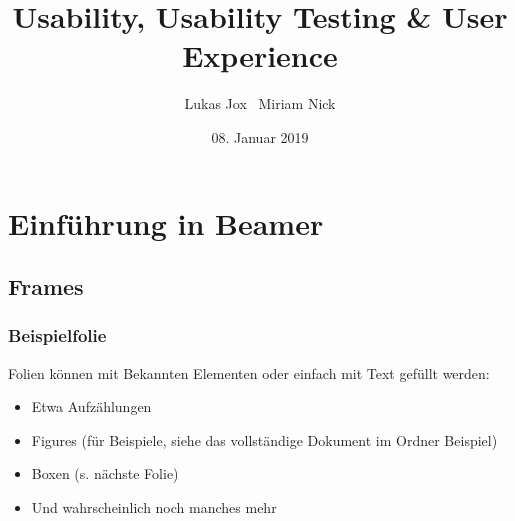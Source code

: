 \documentclass{beamer}
\title[Usability Testing \& UX]{Usability, Usability Testing \& User Experience}
\author{Lukas Jox \textbar\ Miriam Nick}
\date{08. Januar 2019}
\institute
{Seminar: Mensch-Computer-Interaktion\\[0.7em] Institut für Psychologie und Pädagogik}
\begin{document}
\begin{frame}
\titlepage
\end{frame}

\begin{frame}
\tableofcontents
\end{frame}


\expandafter\def\expandafter\insertshorttitle\expandafter{%
  \insertshorttitle\hfill%
  \insertframenumber$\vert$\inserttotalframenumber}
  
\section{Einführung in Beamer}
\subsection{Frames}

\begin{frame}
\frametitle{Beispielfolie}
Folien können mit Bekannten Elementen oder einfach mit Text gefüllt werden:
\vspace{0,5cm}
\begin{itemize}
\item Etwa Aufzählungen
\item Figures (für Beispiele, siehe das vollständige Dokument im Ordner Beispiel)
\item Boxen (s. nächste Folie)
\item Und wahrscheinlich noch manches mehr
\end{itemize}
\end{frame}
\end{document}
